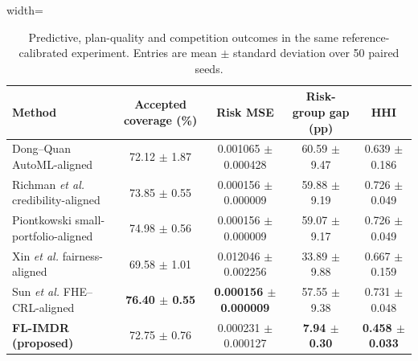 \begin{table}[t]
\centering
\caption{Predictive, plan-quality and competition outcomes in the same reference-calibrated experiment. Entries are mean $\pm$ standard deviation over 50 paired seeds.}
\label{tab:external_prediction_fairness}
\renewcommand{\arraystretch}{1.12}
\begin{adjustbox}{width=\textwidth}
\begin{tabular}{lcccc}
\toprule
Method & Accepted coverage (\%) & Risk MSE & Risk-group gap (pp) & HHI \\
\midrule
Dong--Quan AutoML-aligned~\cite{DongQuan2025} & 72.12 $\pm$ 1.87 & 0.001065 $\pm$ 0.000428 & 60.59 $\pm$ 9.47 & 0.639 $\pm$ 0.186 \\
Richman \emph{et al.} credibility-aligned~\cite{Richman2025} & 73.85 $\pm$ 0.55 & 0.000156 $\pm$ 0.000009 & 59.88 $\pm$ 9.19 & 0.726 $\pm$ 0.049 \\
Piontkowski small-portfolio-aligned~\cite{Piontkowski2025} & 74.98 $\pm$ 0.56 & 0.000156 $\pm$ 0.000009 & 59.07 $\pm$ 9.17 & 0.726 $\pm$ 0.049 \\
Xin \emph{et al.} fairness-aligned~\cite{Xin2025} & 69.58 $\pm$ 1.01 & 0.012046 $\pm$ 0.002256 & 33.89 $\pm$ 9.88 & 0.667 $\pm$ 0.159 \\
Sun \emph{et al.} FHE--CRL-aligned~\cite{Sun2026} & \textbf{76.40 $\pm$ 0.55} & \textbf{0.000156 $\pm$ 0.000009} & 57.55 $\pm$ 9.38 & 0.731 $\pm$ 0.048 \\
\textbf{FL-IMDR (proposed)} & 72.75 $\pm$ 0.76 & 0.000231 $\pm$ 0.000127 & \textbf{7.94 $\pm$ 0.30} & \textbf{0.458 $\pm$ 0.033} \\
\bottomrule
\end{tabular}
\end{adjustbox}
\end{table}
